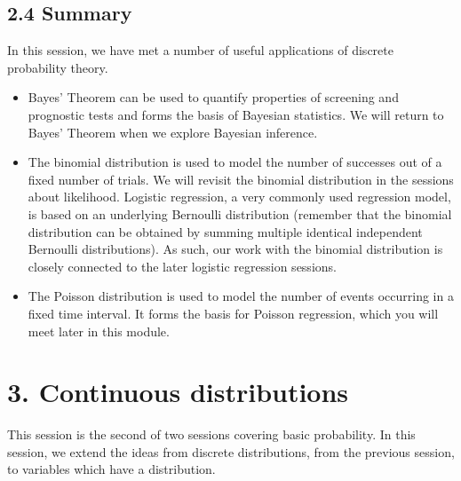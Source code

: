 \documentclass[letterpaper,10pt,english]{jupyterBook}
\begin{document}
\section{2.4 Summary}
\label{\detokenize{02.e. Probability.Discrete:summary}}\label{\detokenize{02.e. Probability.Discrete::doc}}
\sphinxAtStartPar
In this session, we have met a number of useful applications of discrete probability theory.
\begin{itemize}
\item {} 
\sphinxAtStartPar
Bayes’ Theorem can be used to quantify properties of screening and prognostic tests and forms the basis of Bayesian statistics. We will return to Bayes’ Theorem when we explore Bayesian inference.

\item {} 
\sphinxAtStartPar
The binomial distribution is used to model the number of successes out of a fixed number of trials. We will revisit the binomial distribution in the sessions about likelihood. Logistic regression, a very commonly used regression model, is based on an underlying Bernoulli distribution (remember that the binomial distribution can be obtained by summing multiple identical independent Bernoulli distributions). As such, our work with the binomial distribution is closely connected to the later logistic regression sessions.

\item {} 
\sphinxAtStartPar
The Poisson distribution is used to model the number of events occurring in a fixed time interval. It forms the basis for Poisson regression, which you will meet later in this module.

\end{itemize}


\chapter{3. Continuous distributions}
\label{\detokenize{03.a. Continuous Probability Distributions:continuous-distributions}}\label{\detokenize{03.a. Continuous Probability Distributions::doc}}
\sphinxAtStartPar
This session is the second of two sessions covering basic probability. In this session, we extend the ideas from discrete distributions, from the previous session, to variables which have a  distribution.
\end{document}
